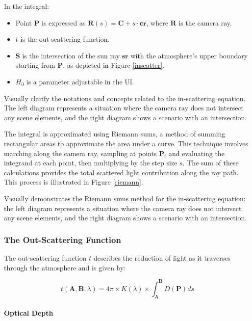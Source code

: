 In the integral:
\begin{itemize}
    \item Point $\mathbf{P}$ is expressed as $\mathbf{R}(s) = \mathbf{C} + s \cdot \mathbf{cr}$, where $\mathbf{R}$ is the camera ray.
    \item $t$ is the out-scattering function.
    \item $\mathbf{S}$ is the intersection of the sun ray $\mathbf{sr}$ with the atmosphere's upper boundary starting from $\mathbf{P}$, as depicted in Figure \ref{inscatter}.
    \item $H_0$ is a parameter adjustable in the UI.
\end{itemize}

{Visually clarify the notations and concepts related to the in-scattering equation. The left diagram represents a situation where the camera ray does not intersect any scene elements, and the right diagram shows a scenario with an intersection.}

The integral is approximated using Riemann sums, a method of summing rectangular areas to approximate the area under a curve. This technique involves marching along the camera ray, sampling at points $\mathbf{P}_i$ and evaluating the integrand at each point, then multiplying by the step size $s$. The sum of these calculations provides the total scattered light contribution along the ray path. This process is illustrated in Figure \ref{riemann}.

{Visually demonstrates the Riemann sums method for the in-scattering equation: the left diagram represents a situation where the camera ray does not intersect any scene elements, and the right diagram shows a scenario with an intersection.}

\subsubsection{The Out-Scattering Function}

The out-scattering function $t$ describes the reduction of light as it traverses through the atmosphere and is given by:

\begin{equation}
    t(\mathbf{A}, \mathbf{B}, \lambda) = 4\pi \times K(\lambda) \times \int_{\mathbf{A}}^{\mathbf{B}} D(\mathbf{P}) ds
\end{equation}

\paragraph{Optical Depth}

